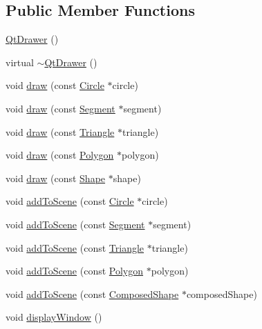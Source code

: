 \subsection*{Public Member Functions}
\begin{DoxyCompactItemize}
\item 
\hyperlink{class_qt_drawer_a1d7dce4e986de57aa3dfb7f39052b54e}{Qt\+Drawer} ()
\item 
virtual \hyperlink{class_qt_drawer_a73b63daa39c4824da08c1486b099a160}{$\sim$\+Qt\+Drawer} ()
\item 
void \hyperlink{class_qt_drawer_a1e9a6ad76355f26fc9b41b54b28a04f4}{draw} (const \hyperlink{class_circle}{Circle} $\ast$circle)
\item 
void \hyperlink{class_qt_drawer_afe2f299e83092e1d4676c8b3fd4a3452}{draw} (const \hyperlink{class_segment}{Segment} $\ast$segment)
\item 
void \hyperlink{class_qt_drawer_a6d68080c84447a76b34810ca0330fd2c}{draw} (const \hyperlink{class_triangle}{Triangle} $\ast$triangle)
\item 
void \hyperlink{class_qt_drawer_a977cc5f97827eb36063f8429ef044727}{draw} (const \hyperlink{class_polygon}{Polygon} $\ast$polygon)
\item 
void \hyperlink{class_qt_drawer_a031e3b3242e341fa6e6fdcbf96b3dbfe}{draw} (const \hyperlink{class_shape}{Shape} $\ast$shape)
\item 
void \hyperlink{class_qt_drawer_a404a989a5cf6f7b5e7469e251045dacb}{add\+To\+Scene} (const \hyperlink{class_circle}{Circle} $\ast$circle)
\item 
void \hyperlink{class_qt_drawer_a7210a0775cf19ce5de0601028c8d7712}{add\+To\+Scene} (const \hyperlink{class_segment}{Segment} $\ast$segment)
\item 
void \hyperlink{class_qt_drawer_a5515539c77eb172644859e115a8044bc}{add\+To\+Scene} (const \hyperlink{class_triangle}{Triangle} $\ast$triangle)
\item 
void \hyperlink{class_qt_drawer_a48a8a31ffdc14e6122b78779c0cdfb39}{add\+To\+Scene} (const \hyperlink{class_polygon}{Polygon} $\ast$polygon)
\item 
void \hyperlink{class_qt_drawer_adaec0c490edc2cd18ece227a0f56dbfa}{add\+To\+Scene} (const \hyperlink{class_composed_shape}{Composed\+Shape} $\ast$composed\+Shape)
\item 
void \hyperlink{class_qt_drawer_a43c474754631c15519485533caf18a89}{display\+Window} ()
\end{DoxyCompactItemize}


